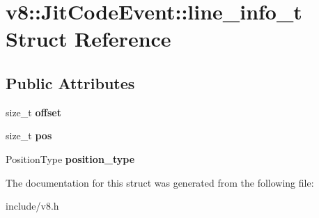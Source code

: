 \hypertarget{structv8_1_1_jit_code_event_1_1line__info__t}{}\section{v8\+:\+:Jit\+Code\+Event\+:\+:line\+\_\+info\+\_\+t Struct Reference}
\label{structv8_1_1_jit_code_event_1_1line__info__t}
\subsection*{Public Attributes}
\begin{DoxyCompactItemize}
\item 
size\+\_\+t {\bfseries offset}\hypertarget{structv8_1_1_jit_code_event_1_1line__info__t_a084f165114adc594e838ef5fe0c879d6}{}\label{structv8_1_1_jit_code_event_1_1line__info__t_a084f165114adc594e838ef5fe0c879d6}

\item 
size\+\_\+t {\bfseries pos}\hypertarget{structv8_1_1_jit_code_event_1_1line__info__t_aad9a3d593ffa9b647b31b67f60ad19f2}{}\label{structv8_1_1_jit_code_event_1_1line__info__t_aad9a3d593ffa9b647b31b67f60ad19f2}

\item 
Position\+Type {\bfseries position\+\_\+type}\hypertarget{structv8_1_1_jit_code_event_1_1line__info__t_ad8a0e551ed2b67096a3fe2f64e2b77a2}{}\label{structv8_1_1_jit_code_event_1_1line__info__t_ad8a0e551ed2b67096a3fe2f64e2b77a2}

\end{DoxyCompactItemize}


The documentation for this struct was generated from the following file\+:\begin{DoxyCompactItemize}
\item 
include/v8.\+h\end{DoxyCompactItemize}
